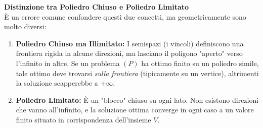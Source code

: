 \documentclass[12pt, a4paper]{article}
\begin{document}
	\vspace{0.4cm}
	\textbf{Distinzione tra Poliedro Chiuso e Poliedro Limitato}\\
	È un errore comune confondere questi due concetti, ma geometricamente sono molto diversi:
	
	\begin{enumerate}
		\item \textbf{Poliedro Chiuso ma Illimitato:} I semispazi (i vincoli) definiscono una frontiera rigida in alcune direzioni, ma lasciano il poligono "aperto" verso l'infinito in altre. Se un problema $(P)$ ha ottimo finito su un poliedro simile, tale ottimo deve trovarsi \textit{sulla frontiera} (tipicamente su un vertice), altrimenti la soluzione scapperebbe a $+\infty$.
		
		\item \textbf{Poliedro Limitato:} È un "blocco" chiuso su ogni lato. Non esistono direzioni che vanno all'infinito, e la soluzione ottima converge in ogni caso a un valore finito situato in corrispondenza dell'insieme $V$.
	\end{enumerate}
	
\end{document}
